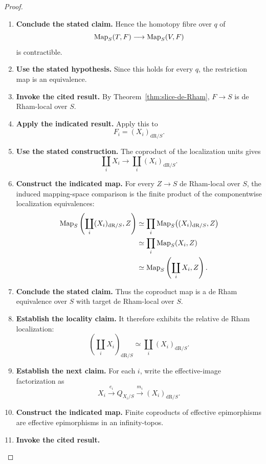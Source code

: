 \begin{proof}
\begin{enumerate}[label=\textup{(\arabic*)}]
    extension space is contractible.
    \item \textbf{Conclude the stated claim.}
    Hence the homotopy fibre over \(q\) of
    \[
    \operatorname{Map}_S(T,F)\longrightarrow\operatorname{Map}_S(V,F)
    \]
    is contractible.
    \item \textbf{Use the stated hypothesis.}
    Since this holds for every \(q\), the restriction map is an
    equivalence.
    \item \textbf{Invoke the cited result.}
    By Theorem~\ref{thm:slice-de-Rham}, \(F\to S\) is de Rham-local
    over \(S\).
    \item \textbf{Apply the indicated result.}
    Apply this to
    \[
    F_i=(X_i)_{\mathrm{dR}/S}.
    \]
    \item \textbf{Use the stated construction.}
    The coproduct of the localization units gives
    \[
    \coprod_iX_i
    \longrightarrow
    \coprod_i(X_i)_{\mathrm{dR}/S}.
    \]
    \item \textbf{Construct the indicated map.}
    For every \(Z\to S\) de Rham-local over \(S\), the induced mapping-space comparison is
    the finite product of the componentwise localization equivalences:
    \[
    \begin{aligned}
    \operatorname{Map}_S\left(\coprod_i(X_i)_{\mathrm{dR}/S},Z\right)
    &\simeq
    \prod_i
    \operatorname{Map}_S\bigl((X_i)_{\mathrm{dR}/S},Z\bigr)
    \\
    &\simeq
    \prod_i\operatorname{Map}_S(X_i,Z)
    \\
    &\simeq
    \operatorname{Map}_S\left(\coprod_iX_i,Z\right).
    \end{aligned}
    \]
    \item \textbf{Conclude the stated claim.}
    Thus the coproduct map is a de Rham equivalence over \(S\) with target de Rham-local
    over \(S\).
    \item \textbf{Establish the locality claim.}
    It therefore exhibits the relative de Rham localization:
    \[
    \left(\coprod_iX_i\right)_{\mathrm{dR}/S}
    \simeq
    \coprod_i(X_i)_{\mathrm{dR}/S}.
    \]
    \item \textbf{Establish the next claim.}
    For each \(i\), write the effective-image factorization as
    \[
    X_i
    \xrightarrow{e_i}
    Q_{X_i/S}
    \xrightarrow{m_i}
    (X_i)_{\mathrm{dR}/S}.
    \]
    \item \textbf{Construct the indicated map.}
    Finite coproducts of effective epimorphisms are effective epimorphisms in an
    infinity-topos.
    \item \textbf{Invoke the cited result.}

\end{enumerate}
\end{proof}
